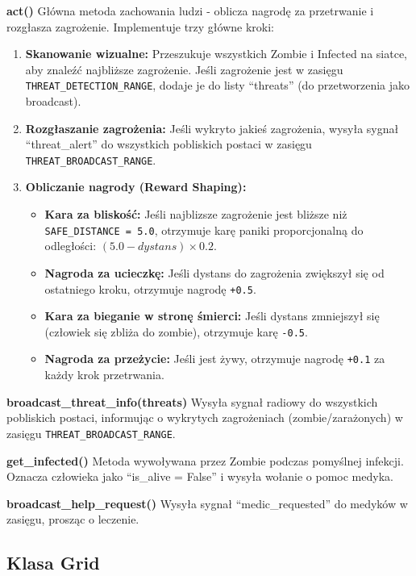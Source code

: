 \documentclass[12pt,a4paper]{article}
\begin{document}
\textbf{act()}
Główna metoda zachowania ludzi - oblicza nagrodę za przetrwanie i rozgłasza zagrożenie. Implementuje trzy główne kroki:

\begin{enumerate}
	\item \textbf{Skanowanie wizualne:} Przeszukuje wszystkich Zombie i Infected na siatce, aby znaleźć najbliższe zagrożenie. Jeśli zagrożenie jest w zasięgu \texttt{THREAT\_DETECTION\_RANGE}, dodaje je do listy ``threats'' (do przetworzenia jako broadcast).

	\item \textbf{Rozgłaszanie zagrożenia:} Jeśli wykryto jakieś zagrożenia, wysyła sygnał ``threat\_alert'' do wszystkich pobliskich postaci w zasięgu \texttt{THREAT\_BROADCAST\_RANGE}.

	\item \textbf{Obliczanie nagrody (Reward Shaping):}
	      \begin{itemize}
		      \item \textbf{Kara za bliskość:} Jeśli najblizsze zagrożenie jest bliższe niż \texttt{SAFE\_DISTANCE = 5.0}, otrzymuje karę paniki proporcjonalną do odległości: $(5.0 - dystans) \times 0.2$.
		      \item \textbf{Nagroda za ucieczkę:} Jeśli dystans do zagrożenia zwiększył się od ostatniego kroku, otrzymuje nagrodę \texttt{+0.5}.
		      \item \textbf{Kara za bieganie w stronę śmierci:} Jeśli dystans zmniejszył się (człowiek się zbliża do zombie), otrzymuje karę \texttt{-0.5}.
		      \item \textbf{Nagroda za przeżycie:} Jeśli jest żywy, otrzymuje nagrodę \texttt{+0.1} za każdy krok przetrwania.
	      \end{itemize}
\end{enumerate}

\textbf{broadcast\_threat\_info(threats)}
Wysyła sygnał radiowy do wszystkich pobliskich postaci, informując o wykrytych zagrożeniach (zombie/zarażonych) w zasięgu \texttt{THREAT\_BROADCAST\_RANGE}.

\textbf{get\_infected()}
Metoda wywoływana przez Zombie podczas pomyślnej infekcji. Oznacza człowieka jako ``is\_alive = False'' i wysyła wołanie o pomoc medyka.

\textbf{broadcast\_help\_request()}
Wysyła sygnał ``medic\_requested'' do medyków w zasięgu, prosząc o leczenie.

\subsection{Klasa Grid}
\end{document}
